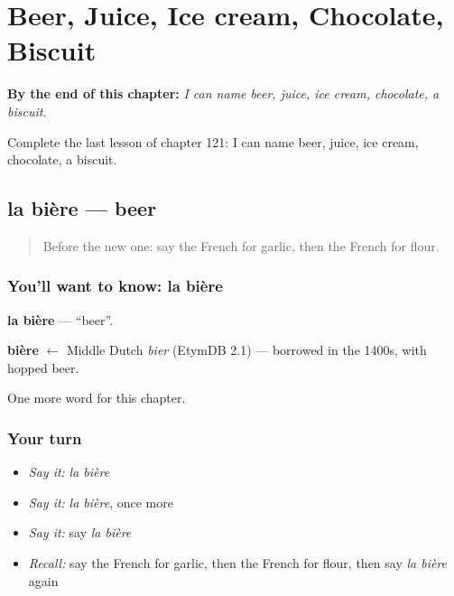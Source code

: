 
\chapter{Beer, Juice, Ice cream, Chocolate, Biscuit}
\label{ch:fr-beer-juice-ice-cream-chocolate-biscuit}

\begin{chapteropening}
\textbf{By the end of this chapter:} \emph{I can name beer, juice, ice cream, chocolate, a biscuit.}

Complete the last lesson of chapter 121: I can name beer, juice, ice cream, chocolate, a biscuit.
\end{chapteropening}

\section[la bière]{la bière — beer}

\label{lesson:FR-C121-biere}



\begin{quote}
Before the new one: say the French for garlic, then the French for flour.
\end{quote}

\subsection*{You'll want to know: la bière}
\textbf{la bière} — \textquotedblleft{}beer\textquotedblright{}.

\begin{cousinweb}
\textbf{bière} $\leftarrow$ Middle Dutch \emph{bier} (EtymDB 2.1) — borrowed in the 1400s, with hopped beer.
\end{cousinweb}

\begin{grammarlens}[title={What you've built}]
One more word for this chapter.
\end{grammarlens}

\subsection*{Your turn}
\begin{itemize}
\raggedright
  \item \emph{Say it:} \emph{la bière}
  \item \emph{Say it:} \emph{la bière}, once more
  \item \emph{Say it:} say \emph{la bière}
  \item \emph{Recall:} say the French for garlic, then the French for flour, then say \emph{la bière} again
\end{itemize}

